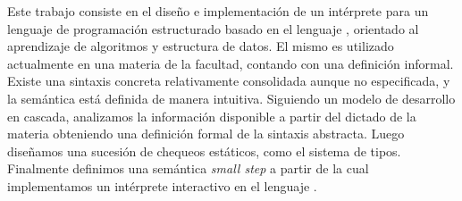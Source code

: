 Este trabajo consiste en el diseño e implementación de un intérprete para un lenguaje de programación estructurado basado en el lenguaje \Pascal{}, orientado al aprendizaje de algoritmos y estructura de datos.
El mismo es utilizado actualmente en una materia de la facultad, contando con una definición informal.
Existe una sintaxis concreta relativamente consolidada aunque no especificada, y la semántica está definida de manera intuitiva.
Siguiendo un modelo de desarrollo en cascada, analizamos la información disponible a partir del dictado de la materia obteniendo una definición formal de la sintaxis abstracta.
Luego diseñamos una sucesión de chequeos estáticos, como el sistema de
tipos.
Finalmente definimos una semántica \textit{small step} a partir de la cual implementamos un intérprete interactivo en el lenguaje \Haskell{}.
